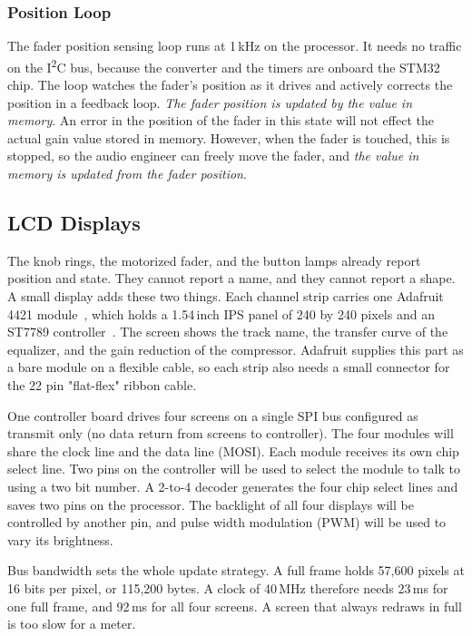 \documentclass[11pt, letterpaper,titlepage]{article}
\begin{document}
\subsubsection*{Position Loop}
\label{sssec:fader-loop}

The fader position sensing loop runs at 1\,kHz on the processor. It needs no traffic on the
I\textsuperscript{2}C bus, because the converter and the timers are onboard the STM32 chip. The loop watches the fader's position as it
drives and actively corrects the position in a feedback loop. \textit{The fader position is updated by the value in memory}. An error in the position of the fader in this state will not effect the actual gain value stored in memory. However, when the fader is touched, this is stopped, so the audio engineer can freely move the fader, and \textit{the value in memory is updated from the fader position}.





\subsection{LCD Displays}
\label{ssec:displays}

The knob rings, the motorized fader, and the button lamps already report
position and state. They cannot report a name, and they cannot report a shape.
A small display adds these two things. Each channel strip carries one Adafruit
4421 module~\cite{ada4421}, which holds a 1.54\,inch IPS panel of 240 by 240 pixels and an
ST7789 controller~\cite{st7789}. The screen shows the track name, the transfer curve of the
equalizer, and the gain reduction of the compressor. Adafruit supplies this
part as a bare module on a flexible cable, so each strip also needs a small
connector for the 22 pin "flat-flex" ribbon cable.

One controller board drives four screens on a single SPI bus configured as transmit only (no data return from screens to controller). The four modules will 
share the clock line and the data line (MOSI). Each module receives its own chip select line. Two pins on the controller will be used to select the module to talk to using a two bit number. A 2-to-4 decoder generates the four chip select lines and saves two pins on the processor. The backlight of all four displays will be controlled by another pin, and pulse width modulation (PWM) will be used to vary its brightness.

Bus bandwidth sets the whole update strategy. A full frame holds 57,600 pixels
at 16 bits per pixel, or 115,200 bytes. A clock of 40\,MHz therefore needs
23\,ms for one full frame, and 92\,ms for all four screens. A screen that always
redraws in full is too slow for a meter.
\end{document}
